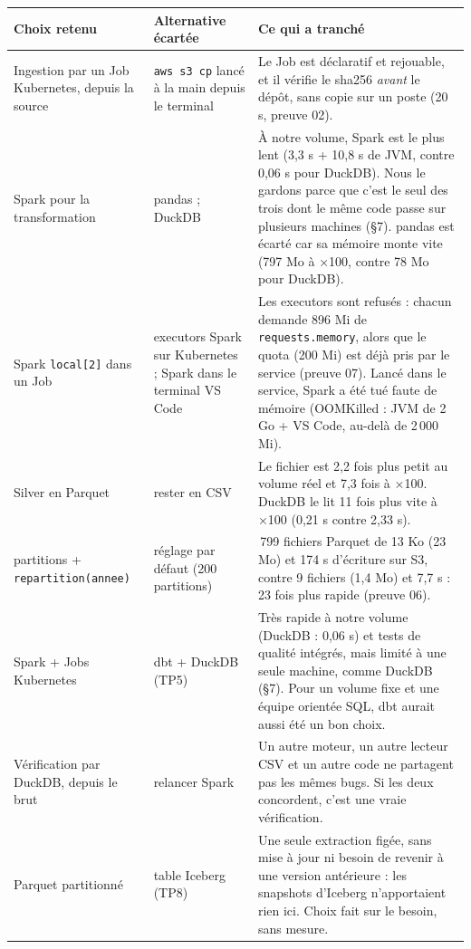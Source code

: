 \documentclass[10pt,a4paper]{article}
\newcommand{\code}[1]{\texttt{\small #1}}
\begin{document}
{\footnotesize
\begin{tabularx}{\linewidth}{@{}>{\raggedright\arraybackslash}p{3.1cm} >{\raggedright\arraybackslash}p{3.6cm} >{\raggedright\arraybackslash}X@{}}
\toprule
\textbf{Choix retenu} & \textbf{Alternative écartée} & \textbf{Ce qui a tranché} \\
\midrule
Ingestion par un Job Kubernetes, depuis la source & \code{aws s3 cp} lancé à la main depuis le terminal & Le Job est déclaratif et rejouable, et il vérifie le sha256 \emph{avant} le dépôt, sans copie sur un poste (20 s, preuve 02). \\
Spark pour la transformation & pandas ; DuckDB & À notre volume, Spark est le plus lent (3,3 s + 10,8 s de JVM, contre 0,06 s pour DuckDB). Nous le gardons parce que c'est le seul des trois dont le même code passe sur plusieurs machines (§7). pandas est écarté car sa mémoire monte vite (797 Mo à ×100, contre 78 Mo pour DuckDB). \\
Spark \code{local[2]} dans un Job & executors Spark sur Kubernetes ; Spark dans le terminal VS Code & Les executors sont refusés : chacun demande 896 Mi de \code{requests.memory}, alors que le quota (200 Mi) est déjà pris par le service (preuve 07). Lancé dans le service, Spark a été tué faute de mémoire (OOMKilled : JVM de 2 Go + VS Code, au-delà de 2\,000 Mi). \\
Silver en Parquet & rester en CSV & Le fichier est 2,2 fois plus petit au volume réel et 7,3 fois à ×100. DuckDB le lit 11 fois plus vite à ×100 (0,21 s contre 2,33 s). \\
8 partitions + \code{repartition(annee)} & réglage par défaut (200 partitions) & 1\,799 fichiers Parquet de 13 Ko (23 Mo) et 174 s d'écriture sur S3, contre 9 fichiers (1,4 Mo) et 7,7 s : 23 fois plus rapide (preuve 06). \\
Spark + Jobs Kubernetes & dbt + DuckDB (TP5) & Très rapide à notre volume (DuckDB : 0,06 s) et tests de qualité intégrés, mais limité à une seule machine, comme DuckDB (§7). Pour un volume fixe et une équipe orientée SQL, dbt aurait aussi été un bon choix. \\
Vérification par DuckDB, depuis le brut & relancer Spark & Un autre moteur, un autre lecteur CSV et un autre code ne partagent pas les mêmes bugs. Si les deux concordent, c'est une vraie vérification. \\
Parquet partitionné & table Iceberg (TP8) & Une seule extraction figée, sans mise à jour ni besoin de revenir à une version antérieure : les snapshots d'Iceberg n'apportaient rien ici. Choix fait sur le besoin, sans mesure. \\
\bottomrule
\end{tabularx}}
\end{document}
